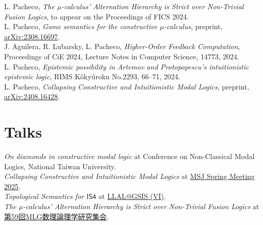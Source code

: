 \documentclass[11pt, a4paper]{article}
\newcommand{\years}[1]{\marginnote{\scriptsize #1}}
\begin{document}
L. Pacheco, \emph{The $\mu$-calculus' Alternation Hierarchy is Strict over Non-Trivial Fusion Logics}, to appear on the Proceedings of FICS 2024. \\

L. Pacheco, \emph{Game semantics for the constructive $\mu$-calculus}, preprint, \href{https://arxiv.org/abs/2308.16697}{arXiv:2308.16697}. \\

J. Aguilera, R. Lubarsky, L. Pacheco, \emph{Higher-Order Feedback Computation}, Proceedings of CiE 2024, Lecture Notes in Computer Science, 14773, 2024. \\

L. Pacheco, \emph{Epistemic possibility in Artemov and Protopopescu's intuitionistic epistemic logic}, RIMS Kôkyûroku No.2293, 66--71, 2024. \\

L. Pacheco, \emph{Collapsing Constructive and Intuitionistic Modal Logics}, preprint, \href{https://arxiv.org/abs/2408.16428}{arXiv:2408.16428}.

\newpage
\section*{Talks}



\years{2025} \emph{On diamonds in constructive modal logic} at Conference on Non-Classical Modal Logics, National Taiwan University.\\

\years{2025} \emph{Collapsing Constructive and Intuitionistic Modal Logics} at \href{https://www.mathsoc.jp/en/meeting/waseda25mar/}{MSJ Spring Meeting 2025}.\\

\years{2025} \emph{Topological Semantics for \(\mathsf{IS4}\)} at \href{https://sites.google.com/view/llal-at-gsis/meetings/llalgsis-6}{LLAL@GSIS (VI)}.\\

\years{2025} \emph{The \(\mu\)-calculus' Alternation Hierarchy is Strict over Non-Trivial Fusion Logics} at \href{https://sites.google.com/view/mlg59}{第59回MLG数理論理学研究集会}.\\
\end{document}
